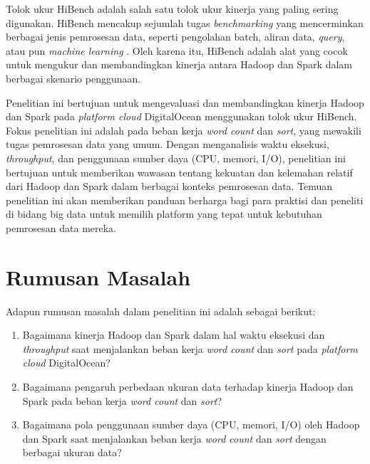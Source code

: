 Tolok ukur HiBench adalah salah satu tolok ukur kinerja yang paling sering digunakan. HiBench mencakup sejumlah tugas \textit{benchmarking} yang mencerminkan berbagai jenis pemrosesan data, seperti pengolahan batch, aliran data, \textit{query}, atau pun \textit{machine learning} \cite{huangHiBenchBenchmarkSuitea}. Oleh karena itu, HiBench adalah alat yang cocok untuk mengukur dan membandingkan kinerja antara Hadoop dan Spark dalam berbagai skenario penggunaan.

Penelitian ini bertujuan untuk mengevaluasi dan membandingkan kinerja Hadoop dan Spark pada \textit{platform cloud} DigitalOcean menggunakan tolok ukur HiBench. Fokus penelitian ini adalah pada beban kerja \textit{word count} dan \textit{sort}, yang mewakili tugas pemrosesan data yang umum. Dengan menganalisis waktu eksekusi, \textit{throughput}, dan penggunaan sumber daya (CPU, memori, I/O), penelitian ini bertujuan untuk memberikan wawasan tentang kekuatan dan kelemahan relatif dari Hadoop dan Spark dalam berbagai konteks pemrosesan data. Temuan penelitian ini akan memberikan panduan berharga bagi para praktisi dan peneliti di bidang big data untuk memilih platform yang tepat untuk kebutuhan pemrosesan data mereka.

\section{Rumusan Masalah}
Adapun rumusan masalah dalam penelitian ini adalah sebagai berikut:
\begin{enumerate}
\item Bagaimana kinerja Hadoop dan Spark dalam hal waktu eksekusi dan \textit{throughput} saat menjalankan beban kerja \textit{word count} dan \textit{sort} pada \textit{platform cloud} DigitalOcean?
\item Bagaimana pengaruh perbedaan ukuran data terhadap kinerja Hadoop dan Spark pada beban kerja \textit{word count} dan \textit{sort}?
\item Bagaimana pola penggunaan sumber daya (CPU, memori, I/O) oleh Hadoop dan Spark saat menjalankan beban kerja \textit{word count} dan \textit{sort} dengan berbagai ukuran data?
\end{enumerate}

